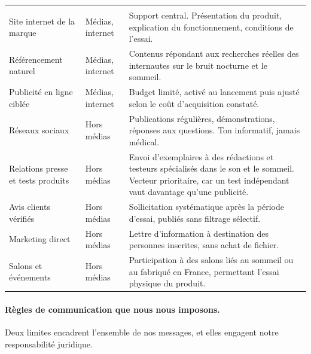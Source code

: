 \begin{center}
\begin{xltabular}{\textwidth}{P{3.4cm}P{2.6cm}L}
\toprule
{} &  &  \\
\midrule
\endfirsthead
\toprule
{} &  &  \\
\midrule
\endhead

Site internet de la marque & Médias, internet & Support central. Présentation du
produit, explication du fonctionnement, conditions de l'essai. \\

Référencement naturel & Médias, internet & Contenus répondant aux recherches
réelles des internautes sur le bruit nocturne et le sommeil. \\

Publicité en ligne ciblée & Médias, internet & Budget limité, activé au
lancement puis ajusté selon le coût d'acquisition constaté. \\

Réseaux sociaux & Hors médias & Publications régulières, démonstrations,
réponses aux questions. Ton informatif, jamais médical. \\

Relations presse et tests produits & Hors médias & Envoi d'exemplaires à des
rédactions et testeurs spécialisés dans le son et le sommeil. Vecteur
prioritaire, car un test indépendant vaut davantage qu'une publicité. \\

Avis clients vérifiés & Hors médias & Sollicitation systématique après la
période d'essai, publiés sans filtrage sélectif. \\

Marketing direct & Hors médias & Lettre d'information à destination des
personnes inscrites, sans achat de fichier. \\

Salons et événements & Hors médias & Participation à des salons liés au sommeil
ou au fabriqué en France, permettant l'essai physique du produit. \\
\bottomrule
\end{xltabular}
\end{center}

\paragraph{Règles de communication que nous nous imposons.}
Deux limites encadrent l'ensemble de nos messages, et elles engagent notre
responsabilité juridique.

